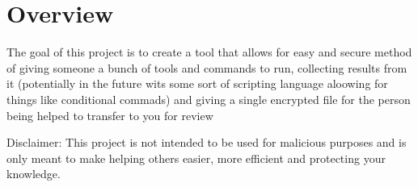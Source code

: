 \chapter{Overview}
The goal of this project is to create a tool that allows for easy and secure method of giving someone a bunch of tools and commands to run, collecting results from it (potentially in the future wits some sort of scripting language aloowing for things like conditional commads) and giving a single encrypted file for the person being helped to transfer to you for review

Disclaimer:
This project is not intended to be used for malicious purposes and is only meant to make helping others easier, more efficient and protecting your knowledge.